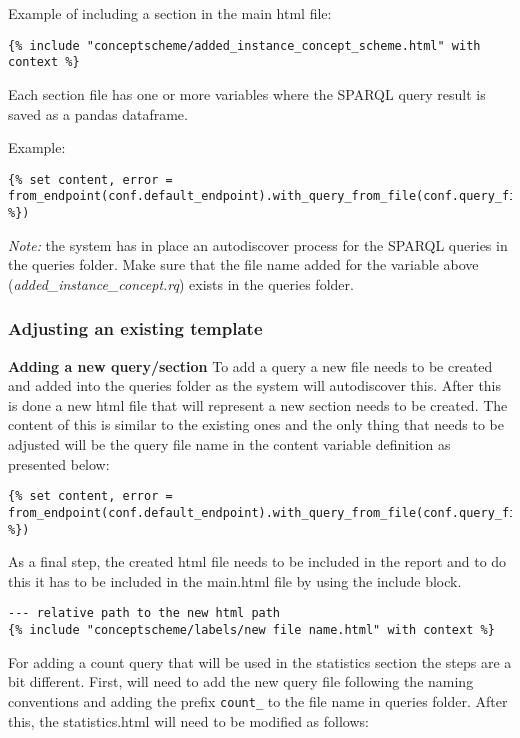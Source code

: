 Example of including a section in the main html file:
\begin{lstlisting}
{% include "conceptscheme/added_instance_concept_scheme.html" with context %}
\end{lstlisting}

Each section file has one or more variables where the SPARQL query result is saved as a pandas dataframe.

Example:
\begin{lstlisting}
{% set content, error = from_endpoint(conf.default_endpoint).with_query_from_file(conf.query_files["added_instance_concept.rq"]).fetch_tabular() %})
\end{lstlisting}

\textit{Note:} the system has in place an autodiscover process for the SPARQL queries in the queries folder. Make sure that the file name added for the variable above (\textit{added\_instance\_concept.rq}) exists in the queries folder.

\subsubsection{Adjusting an existing template}
\textbf{Adding a new query/section}
To add a query a new file needs to be created and added into the queries folder as the system will autodiscover this. After this is done a new html file that will represent a new section needs to be created. The content of this is similar to the existing ones and the only thing that needs to be adjusted will be the query file name in the content variable definition as presented below:

\begin{lstlisting}
{% set content, error = from_endpoint(conf.default_endpoint).with_query_from_file(conf.query_files["new_query_file.rq"]).fetch_tabular() %})
\end{lstlisting}

As a final step, the created html file needs to be included in the report and to do this it has to be included in the main.html file by using the include block.

\begin{lstlisting}
--- relative path to the new html path
{% include "conceptscheme/labels/new file name.html" with context %}
\end{lstlisting}

For adding a count query that will be used in the statistics section the steps are a bit different. First, will need to add the new query file following the naming conventions and adding the prefix \texttt{count\_} to the file name in queries folder. After this, the statistics.html will need to be modified as follows:

